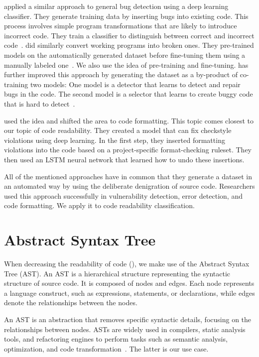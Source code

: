 \documentclass[%
class=scrreprt,
chapterprefix=false,%
open=right,%
twoside=true,%
paper=a4,%
logofile={Logo\_zentral\_farbig\_EN.png},%
thesistype=master,%
UKenglish,%
]{se2thesis}
\theoremstyle{definition}
\newcommand{\rdh}{REDEC\xspace}
\begin{document}
	\citeauthor{pradel2018deepbugs} applied a similar approach to general bug detection using a deep learning classifier. They generate training data by inserting bugs into existing code. This process involves simple program transformations that are likely to introduce incorrect code. They train a classifier to distinguish between correct and incorrect code~\cite{pradel2018deepbugs}.
	\citeauthor{yasunaga2020graph} did similarly convert working programs into broken ones. They pre-trained models on the automatically generated dataset before fine-tuning them using a manually labeled one~\cite{yasunaga2020graph}. We also use the idea of pre-training and fine-tuning. 
	\citeauthor{allamanis2021self} has further improved this approach by generating the dataset as a by-product of co-training two models: One model is a detector that learns to detect and repair bugs in the code. The second model is a selector that learns to create buggy code that is hard to detect~\cite{allamanis2021self}.
		
    \citeauthor{loriot2022styler} used the idea and shifted the area to code formatting. This topic comes closest to our topic of code readability. They created a model that can fix checkstyle violations using deep learning.
    In the first step, they inserted formatting violations into the code based on a project-specific format-checking ruleset.
    They then used an LSTM neural network that learned how to undo these insertions. 
	
	All of the mentioned approaches have in common that they generate a dataset in an automated way by using the deliberate denigration of source code. Researchers used this approach successfully in vulnerability detection, error detection, and code formatting. We apply it to code readability classification.
	
\section{Abstract Syntax Tree} \label{Abstract Syntax Tree}
	When decreasing the readability of code (), we make use of the Abstract Syntax Tree (AST).
	An AST is a hierarchical structure representing the syntactic structure of source code. It is composed of nodes and edges. Each node represents a language construct, such as expressions, statements, or declarations, while edges denote the relationships between the nodes.
		
	An AST is an abstraction that removes specific syntactic details, focusing on the relationships between nodes. ASTs are widely used in compilers, static analysis tools, and refactoring engines to perform tasks such as semantic analysis, optimization, and code transformation~\cite{miller2010abstract}. The latter is our use case.
	
\end{document}
